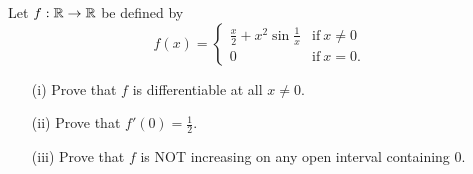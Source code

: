 \documentclass[a4paper]{article}
\begin{document}
\begin{problem}
    Let \( f: \mathbb{R} \to \mathbb{R}  \) be defined by
    \[  f(x) = 
    \begin{cases}
        \frac{ x }{ 2 }  + x^{2} \sin \frac{ 1 }{ x }  &\text{if} \ x \neq 0 \\
        0 &\text{if} \ x = 0. 
    \end{cases} \]
    \begin{enumerate}
        \item[(i)] Prove that \( f  \) is differentiable at all \( x \neq 0  \).
        \item[(ii)] Prove that \( f'(0) = \frac{ 1 }{ 2 }  \).
        \item[(iii)] Prove that \( f  \) is NOT increasing on any open interval containing \( 0  \). 
    \end{enumerate}
\end{problem}
\end{document}
